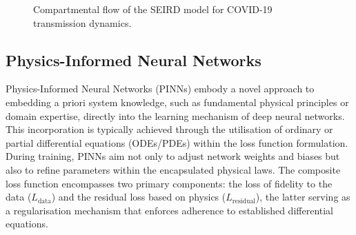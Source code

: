 \documentclass[12pt]{article}
\begin{document}
\begin{figure}[h!]
    \centering
    \caption{Compartmental flow of the SEIRD model for COVID-19 transmission dynamics.}
\end{figure}

\subsection{Physics-Informed Neural Networks}

Physics-Informed Neural Networks (PINNs) embody a novel approach to embedding a priori system knowledge, such as fundamental physical principles or domain expertise, directly into the learning mechanism of deep neural networks. This incorporation is typically achieved through the utilisation of ordinary or partial differential equations (ODEs/PDEs) within the loss function formulation. During training, PINNs aim not only to adjust network weights and biases but also to refine parameters within the encapsulated physical laws. The composite loss function encompasses two primary components: the loss of fidelity to the data ($L_{\text{data}}$) and the residual loss based on physics ($L_{\text{residual}}$), the latter serving as a regularisation mechanism that enforces adherence to established differential equations.
\end{document}
